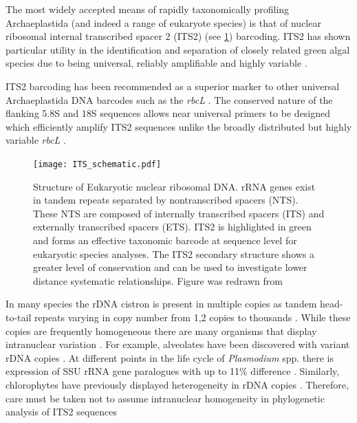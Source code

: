 The most widely accepted means of rapidly taxonomically profiling
Archaeplastida (and indeed a range of eukaryote species) is that of 
nuclear ribosomal internal transcribed spacer 2 (ITS2) (see \cref{fig:its2_schematic}) barcoding. 
ITS2 has shown particular utility in the identification and separation
of closely related green algal species \citep{Buchheim2011,Heeg2015} due to being
universal, reliably amplifiable and highly variable \citep{Hershkovitz1996}.

ITS2 barcoding has been recommended as a superior marker to 
other universal Archaeplastida DNA barcodes such as the \textit{rbcL} 
\citep{Chen2010}.  The conserved nature of the flanking 5.8S and
18S sequences allows near universal primers to be designed which efficiently 
amplify ITS2 sequences unlike the broadly distributed but
highly variable \textit{rbcL} \citep{Buchheim2011}.

\begin{figure}[h]
    \texttt{[image: ITS\_schematic.pdf]}
    \caption[ITS2 structure overview]{Structure of Eukaryotic nuclear ribosomal DNA.
        rRNA genes exist in tandem repeats separated by nontranscribed spacers (NTS).
        These NTS are composed of internally transcribed spacers (ITS) and externally
        transcribed spacers (ETS).
        ITS2 is highlighted in green and forms an effective taxonomic barcode at sequence level 
        for eukaryotic species analyses.  The ITS2 secondary structure
        shows a greater level of conservation and can be used to investigate
        lower distance systematic relationships.  Figure was redrawn from \citep{Shi2005}}
\label{fig:its2_schematic}
\end{figure}

In many species the rDNA cistron is present in multiple copies
as tandem head-to-tail repeats varying in copy number from 1,2 copies
to thousands \citep{Torres-Machorro2010}.  While these copies are
frequently homogeneous there are many organisms that display
intranuclear variation \citep{Buchheim2011}.
For example, alveolates have been discovered with variant 
rDNA copies \citep{Stern2012,Galluzzi2004}. At 
different points in the life cycle of \textit{Plasmodium} spp. \citep{Nishimoto2008}
there is expression of SSU rRNA gene paralogues with up to 11\%
difference \citep{McCutchan1988,Chambouvet2015}.
Similarly, chlorophytes have previously displayed 
heterogeneity in rDNA copies \citep{Pillmann1997,Fama2000}.
Therefore, care must be taken not to assume intranuclear
homogeneity in phylogenetic analysis of ITS2 sequences \citep{Buchheim2011}


